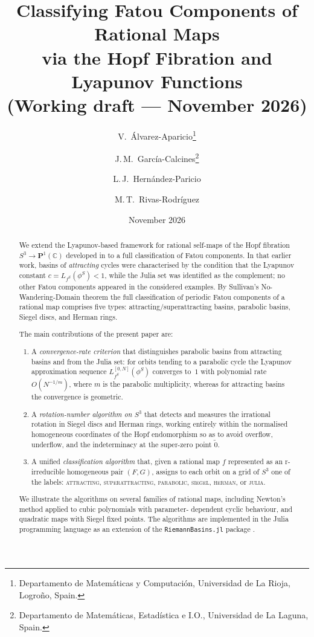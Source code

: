 \documentclass[12pt]{article}
\title{\textbf{Classifying Fatou Components of Rational Maps\\
        via the Hopf Fibration and Lyapunov Functions}\\[6pt]
       {\large (Working draft --- November 2026)}}
\author{V.~\'Alvarez-Aparicio\thanks{Departamento de Matem\'aticas y
Computaci\'on, Universidad de La Rioja, Logro\~no, Spain.} \and
J.\,M.~Garc\'ia-Calcines\thanks{Departamento de Matem\'aticas,
Estad\'istica e I.O., Universidad de La Laguna, Spain.} \and
L.\,J.~Hern\'andez-Paricio\footnotemark[1] \and
M.\,T.~Rivas-Rodr\'iguez\footnotemark[1]}
\date{November 2026}
\theoremstyle{definition}
\newcommand{\C}{\mathbb{C}}
\newcommand{\Pone}{\mathbf{P}^1(\C)}
\begin{document}
\maketitle
\begin{abstract}
We extend the Lyapunov-based framework for rational self-maps of the Hopf
fibration $S^3 \to \Pone$ developed in \cite{Alvarez2023} to a full
classification of Fatou components.  In that earlier work, basins of
\emph{attracting} cycles were characterised by the condition that the
Lyapunov constant $c = L_{f^S}(\phi^S) < 1$, while the Julia set was
identified as the complement; no other Fatou components appeared in the
considered examples.  By Sullivan's No-Wandering-Domain theorem the full
classification of periodic Fatou components of a rational map comprises
five types: attracting/superattracting basins, parabolic basins, Siegel
discs, and Herman rings.

The main contributions of the present paper are:
\begin{enumerate}[label=(\roman*)]
  \item A \emph{convergence-rate criterion} that distinguishes parabolic
        basins from attracting basins and from the Julia set: for orbits
        tending to a parabolic cycle the Lyapunov approximation sequence
        $L_{f^S}^{[0,N]}(\phi^S)$ converges to~$1$ with polynomial rate
        $O(N^{-1/m})$, where $m$ is the parabolic multiplicity, whereas
        for attracting basins the convergence is geometric.
  \item A \emph{rotation-number algorithm on $S^3$} that detects and
        measures the irrational rotation in Siegel discs and Herman rings,
        working entirely within the normalised homogeneous coordinates of
        the Hopf endomorphism so as to avoid overflow, underflow, and the
        indeterminacy at the super-zero point $\tilde{0}$.
  \item A unified \emph{classification algorithm} that, given a rational
        map $f$ represented as an r-irreducible homogeneous pair $(F,G)$,
        assigns to each orbit on a grid of $S^3$ one of the labels:
        \textsc{attracting}, \textsc{superattracting}, \textsc{parabolic},
        \textsc{siegel}, \textsc{herman}, or \textsc{julia}.
\end{enumerate}
We illustrate the algorithms on several families of rational maps,
including Newton's method applied to cubic polynomials with parameter-
dependent cyclic behaviour, and quadratic maps with Siegel fixed points.
The algorithms are implemented in the Julia programming language as an
extension of the \texttt{RiemannBasins.jl} package \cite{RiemannBasins}.
\end{abstract}
\end{document}
